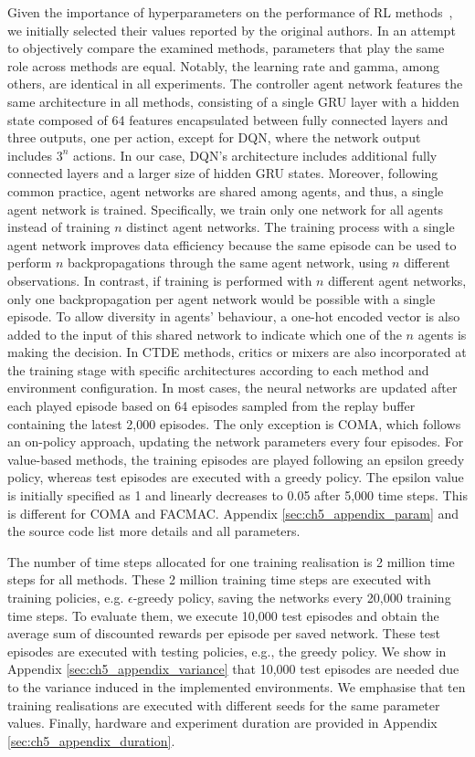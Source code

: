 Given the importance of hyperparameters on the performance of RL methods~\citep{gorsane2022towards}, we initially selected their values reported by the original authors.
In an attempt to objectively compare the examined methods, parameters that play the same role across methods are equal.
Notably, the learning rate and gamma, among others, are identical in all experiments.
The controller agent network features the same architecture in all methods, consisting of a single GRU layer with a hidden state composed of 64 features encapsulated between fully connected layers and three outputs, one per action, except for DQN, where the network output includes $3^n$ actions.
In our case, DQN's architecture includes additional fully connected layers and a larger size of hidden GRU states.
Moreover, following common practice, agent networks are shared among agents, and thus, a single agent network is trained.
Specifically, we train only one network for all agents instead of training $n$ distinct agent networks.
The training process with a single agent network improves data efficiency because the same episode can be used to perform $n$ backpropagations through the same agent network, using $n$ different observations.
In contrast, if training is performed with $n$ different agent networks, only one backpropagation per agent network would be possible with a single episode.
To allow diversity in agents' behaviour, a one-hot encoded vector is also added to the input of this shared network to indicate which one of the $n$ agents is making the decision.
In CTDE methods, critics or mixers are also incorporated at the training stage with specific architectures according to each method and environment configuration.
In most cases, the neural networks are updated after each played episode based on 64 episodes sampled from the replay buffer containing the latest 2,000 episodes.
The only exception is COMA, which follows an on-policy approach, updating the network parameters every four episodes.
For value-based methods, the training episodes are played following an epsilon greedy policy, whereas test episodes are executed with a greedy policy.
The epsilon value is initially specified as 1 and linearly decreases to 0.05 after 5,000 time steps.
This is different for COMA and FACMAC. 
Appendix \ref{sec:ch5_appendix_param} and the source code list more details and all parameters.

The number of time steps allocated for one training realisation is 2 million time steps for all methods.
These 2 million training time steps are executed with training policies, e.g. $\epsilon$-greedy policy, saving the networks every 20,000 training time steps.
To evaluate them, we execute 10,000 test episodes and obtain the average sum of discounted rewards per episode per saved network.
These test episodes are executed with testing policies, e.g., the greedy policy.
We show in Appendix \ref{sec:ch5_appendix_variance} that 10,000 test episodes are needed due to the variance induced in the implemented environments.
We emphasise that ten training realisations are executed with different seeds for the same parameter values.
Finally, hardware and experiment duration are provided in Appendix \ref{sec:ch5_appendix_duration}.

